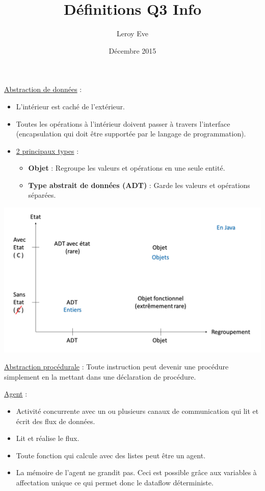 \documentclass[fr,license=none,skiptoc]{../../../eplsummary}
\title{Définitions Q3 Info}
\author{Leroy Eve}
\date{Décembre 2015}
\begin{document}
\maketitle
\begin{flushleft}


\textcolor{mauvedef}{\underline{Abstraction de données}} : 

\begin{itemize}
\item L'intérieur est caché de l'extérieur.
\item Toutes les opérations à l'intérieur doivent passer à travers l'interface (encapsulation qui doit être supportée par le langage de programmation).
\item \underline{2 principaux types} :
\begin{itemize}[label=\textbullet]
\item \textbf{Objet} : Regroupe les valeurs et opérations en une seule entité.
\item \textbf{Type abstrait de données (ADT)} : Garde les valeurs et opérations séparées.
\end{itemize}
\end{itemize}
\begin{center}
\includegraphics[scale=0.4]{ADD.png}
\label{add2}
\end{center}
\bigbreak


\textcolor{mauvedef}{\underline{Abstraction procédurale}} : Toute instruction peut devenir une procédure simplement en la mettant dans une déclaration de procédure.\bigbreak

\textcolor{mauvedef}{\underline{Agent}} :

\begin{itemize}
\item Activité concurrente avec un ou plusieurs canaux de communication qui lit et écrit des flux de données.
\item Lit et réalise le flux.
\item Toute fonction qui calcule avec des listes peut être un agent.
\item La mémoire de l'agent ne grandit pas. Ceci est possible grâce aux variables à affectation unique ce qui permet donc le dataflow déterministe.
\end{itemize} \bigbreak



\end{flushleft}
\end{document}
